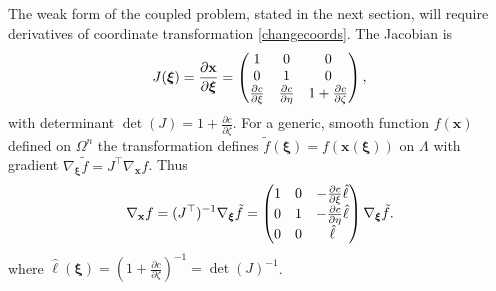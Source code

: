 \documentclass[letterpaper,final,12pt,reqno]{amsart}
\newcommand{\grad}{\nabla}
\newcommand{\bx}{\mathbf{x}}
\newcommand{\bxi}{\bm{\xi}}
\begin{document}
The weak form of the coupled problem, stated in the next section, will require derivatives of coordinate transformation \eqref{changecoords}.  The Jacobian is
\begin{equation}
J(\bxi) = \frac{\partial \bx}{\partial \bm{\xi}} = \begin{pmatrix} 1 & 0 & 0 \\ \strut 0 & 1 & 0 \\ \strut \frac{\partial c}{\partial \xi} & \frac{\partial c}{\partial \eta} & 1+\frac{\partial c}{\partial \zeta} \end{pmatrix}, \label{changejac}
\end{equation}
with determinant $\det(J) = 1+\frac{\partial c}{\partial \zeta}$.  For a generic, smooth function $f(\bx)$ defined on $\Omega^n$ the transformation defines $\tilde f(\bxi) = f(\bx(\bxi))$ on $\Lambda$ with gradient $\grad_{\bxi} \tilde f = J^\top \grad_{\bx} f$.  Thus
\begin{equation}
\grad_{\bx} f = (J^\top)^{-1} \grad_{\bxi} \tilde f = \begin{pmatrix} \strut 1 & 0 & - \frac{\partial c}{\partial \xi} \hat\ell \\ \strut 0 & 1 & -\frac{\partial c}{\partial \eta} \hat\ell \\ \strut 0 & 0 & \hat\ell \end{pmatrix} \grad_{\bxi} \tilde f. \label{changegrad}
\end{equation}
where $\hat\ell(\bxi) = \left(1+\frac{\partial c}{\partial \zeta}\right)^{-1}=\det(J)^{-1}$.
\end{document}
